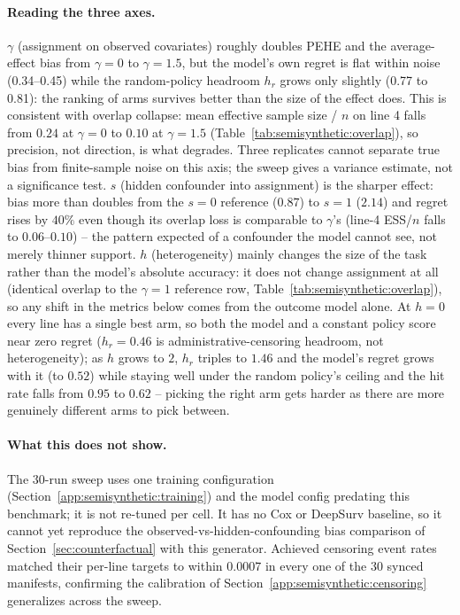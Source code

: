 \paragraph{Reading the three axes.} $\gamma$ (assignment on observed covariates) roughly
doubles PEHE and the average-effect bias from $\gamma=0$ to $\gamma=1.5$, but the model's own
regret is flat within noise (0.34--0.45) while the random-policy headroom $h_r$ grows only
slightly (0.77 to 0.81): the ranking of arms survives better than the size of the effect does.
This is consistent with overlap collapse: mean effective sample size / $n$ on line 4 falls from
$0.24$ at $\gamma=0$ to $0.10$ at $\gamma=1.5$ (Table~\ref{tab:semisynthetic:overlap}), so
precision, not direction, is what degrades. Three replicates cannot separate true bias from
finite-sample noise on this axis; the sweep gives a variance estimate, not a significance test.
$s$ (hidden confounder into assignment) is the sharper effect: bias more than doubles from the
$s=0$ reference ($0.87$) to $s=1$ ($2.14$) and regret rises by $40\%$ even though its overlap
loss is comparable to $\gamma$'s (line-4 ESS/$n$ falls to $0.06$--$0.10$) -- the pattern expected
of a confounder the model cannot see, not merely thinner support. $h$ (heterogeneity) mainly
changes the size of the task rather than the model's absolute accuracy: it does not change
assignment at all (identical overlap to the $\gamma=1$ reference row, Table~\ref{tab:semisynthetic:overlap}),
so any shift in the metrics below comes from the outcome model alone. At $h=0$ every line has
a single best arm, so both the model and a constant policy score near zero regret ($h_r=0.46$
is administrative-censoring headroom, not heterogeneity); as $h$ grows to $2$, $h_r$ triples to
$1.46$ and the model's regret grows with it (to $0.52$) while staying well under the random
policy's ceiling and the hit rate falls from $0.95$ to $0.62$ -- picking the right arm gets
harder as there are more genuinely different arms to pick between.

\paragraph{What this does not show.} The 30-run sweep uses one training configuration
(Section~\ref{app:semisynthetic:training}) and the model config predating this benchmark; it is
not re-tuned per cell. It has no Cox or DeepSurv baseline, so it cannot yet reproduce the
observed-vs-hidden-confounding bias comparison of Section~\ref{sec:counterfactual} with this
generator. Achieved censoring event rates matched their per-line targets to within $0.0007$ in
every one of the 30 synced manifests, confirming the calibration of
Section~\ref{app:semisynthetic:censoring} generalizes across the sweep.

